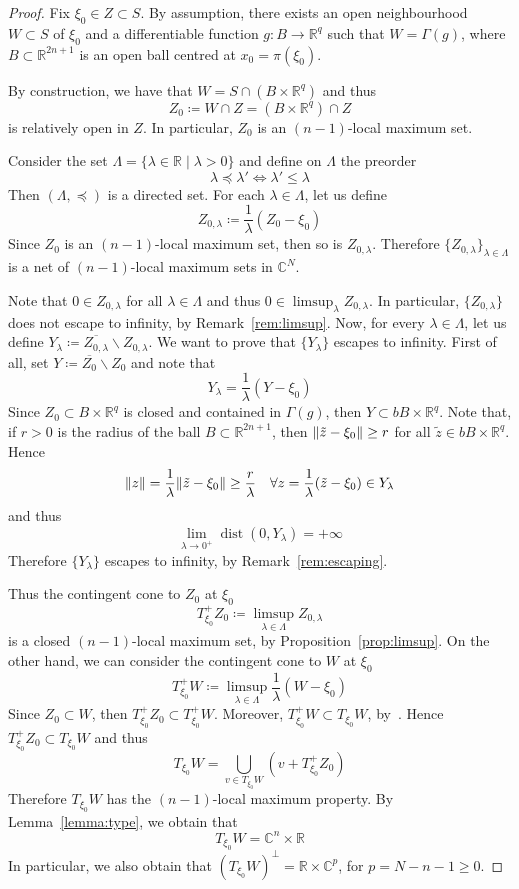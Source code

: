 \documentclass[reqno,oneside]{amsart}
\newcommand{\numberset}{\mathbb}
\newcommand{\R}{\numberset{R}}
\newcommand{\C}{\numberset{C}}
\DeclarePairedDelimiter{\norm}{\lVert}{\rVert}
\theoremstyle{definition}
\theoremstyle{plain}
\theoremstyle{remark}
\begin{document}
\begin{proof}
	Fix $\xi_0\in Z\subset S$. By assumption, there exists an open neighbourhood $W\subset S$ of $\xi_0$ and a differentiable function $g:B\to\R^q$ such that $W=\Gamma(g)$, where $B\subset\R^{2n+1}$ is an open ball centred at $x_0=\pi(\xi_0)$.
	
	By construction, we have that $W=S\cap(B\times\R^q)$ and thus
	\[
		Z_0\coloneqq W\cap Z=(B\times\R^q)\cap Z
	\]
	is relatively open in $Z$. In particular, $Z_0$ is an $(n-1)$-local maximum set.
	
	Consider the set $\Lambda=\{\lambda\in\R \mid \lambda>0\}$ and define on $\Lambda$ the preorder
	\[
		\lambda\preceq\lambda' \iff \lambda'\leq\lambda
	\]
	Then $(\Lambda,\preceq)$ is a directed set. For each $\lambda\in\Lambda$, let us define
	\[
		Z_{0,\lambda}\coloneqq\frac{1}{\lambda}(Z_0-\xi_0)
	\]
	Since $Z_0$ is an $(n-1)$-local maximum set, then so is $Z_{0,\lambda}$. Therefore $\{Z_{0,\lambda}\}_{\lambda\in\Lambda}$ is a net of $(n-1)$-local maximum sets in $\C^N$.
	
	Note that $0\in Z_{0,\lambda}$ for all $\lambda\in\Lambda$ and thus $0\in\limsup_\lambda Z_{0,\lambda}$. In particular, $\{Z_{0,\lambda}\}$ does not escape to infinity, by Remark~\ref{rem:limsup}. Now, for every $\lambda\in\Lambda$, let us define $Y_\lambda\coloneqq\overline{Z_{0,\lambda}}\smallsetminus Z_{0,\lambda}$. We want to prove that $\{Y_\lambda\}$ escapes to infinity. First of all, set $Y\coloneqq\overline{Z_0}\smallsetminus Z_0$ and note that
	\[
		Y_\lambda=\frac{1}{\lambda}(Y-\xi_0)
	\]
	Since $Z_0\subset B\times\R^q$ is closed and contained in $\Gamma(g)$, then $Y\subset bB\times\R^q$. Note that, if $r>0$ is the radius of the ball $B\subset\R^{2n+1}$, then $\norm{\tilde{z}-\xi_0}\geq r$ for all $\tilde{z}\in bB\times\R^q$. Hence
	\[
		\norm{z}=\frac{1}{\lambda}\norm{\tilde{z}-\xi_0}\geq\frac{r}{\lambda} \quad \forall z=\frac{1}{\lambda}(\tilde{z}-\xi_0)\in Y_\lambda
	\]
	and thus
	\[
		\lim_{\lambda\to0^+} \operatorname{dist}(0,Y_\lambda)=+\infty
	\]
	Therefore $\{Y_\lambda\}$ escapes to infinity, by Remark~\ref{rem:escaping}.
	
	Thus the contingent cone to $Z_0$ at $\xi_0$
	\[
		T^+_{\xi_0}Z_0\coloneqq\limsup_{\lambda\in\Lambda}Z_{0,\lambda}
	\]
	is a closed $(n-1)$-local maximum set, by Proposition~\ref{prop:limsup}. On the other hand, we can consider the contingent cone to $W$ at $\xi_0$
	\[
		T^+_{\xi_0}W\coloneqq\limsup_{\lambda\in\Lambda} \frac{1}{\lambda}(W-\xi_0)
	\]
	Since $Z_0\subset W$, then $T_{\xi_0}^+Z_0\subset T_{\xi_0}^+W$. Moreover, $T_{\xi_0}^+W\subset T_{\xi_0}W$, by~\cite[Proposition~2.3]{bigo_greco:characterizations}. Hence $T_{\xi_0}^+Z_0\subset T_{\xi_0}W$ and thus
	\[
		T_{\xi_0}W=\bigcup_{v\in T_{\xi_0}W} (v+T_{\xi_0}^+Z_0)
	\]
	Therefore $T_{\xi_0}W$ has the $(n-1)$-local maximum property. By Lemma~\ref{lemma:type}, we obtain that
	\[
		T_{\xi_0}W=\C^n\times\R
	\]
	In particular, we also obtain that $(T_{\xi_0}W)^\perp=\R\times\C^p$, for $p=N-n-1\geq 0$.
	

\end{proof}
\end{document}
